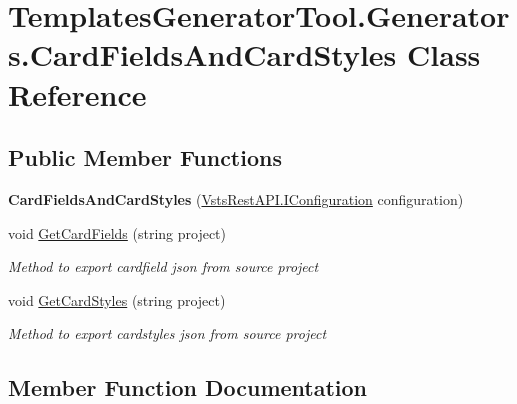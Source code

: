 \hypertarget{class_templates_generator_tool_1_1_generators_1_1_card_fields_and_card_styles}{}\section{Templates\+Generator\+Tool.\+Generators.\+Card\+Fields\+And\+Card\+Styles Class Reference}
\label{class_templates_generator_tool_1_1_generators_1_1_card_fields_and_card_styles}
\subsection*{Public Member Functions}
\begin{DoxyCompactItemize}
\item 
\mbox{\label{class_templates_generator_tool_1_1_generators_1_1_card_fields_and_card_styles_aef09dac397d7f80b7c6a4e7c7ddff47b}} 
{\bfseries Card\+Fields\+And\+Card\+Styles} (\mbox{\hyperlink{interface_vsts_rest_a_p_i_1_1_i_configuration}{Vsts\+Rest\+A\+P\+I.\+I\+Configuration}} configuration)
\item 
void \mbox{\hyperlink{class_templates_generator_tool_1_1_generators_1_1_card_fields_and_card_styles_a3f285cbf53c28a958fff0123d88a3e8a}{Get\+Card\+Fields}} (string project)
\begin{DoxyCompactList}\small\item\em Method to export cardfield json from source project \end{DoxyCompactList}\item 
void \mbox{\hyperlink{class_templates_generator_tool_1_1_generators_1_1_card_fields_and_card_styles_a2882c956f1ddc904ab0502fb78a31ca2}{Get\+Card\+Styles}} (string project)
\begin{DoxyCompactList}\small\item\em Method to export cardstyles json from source project \end{DoxyCompactList}\end{DoxyCompactItemize}


\subsection{Member Function Documentation}
\mbox{\label{class_templates_generator_tool_1_1_generators_1_1_card_fields_and_card_styles_a3f285cbf53c28a958fff0123d88a3e8a}} 
